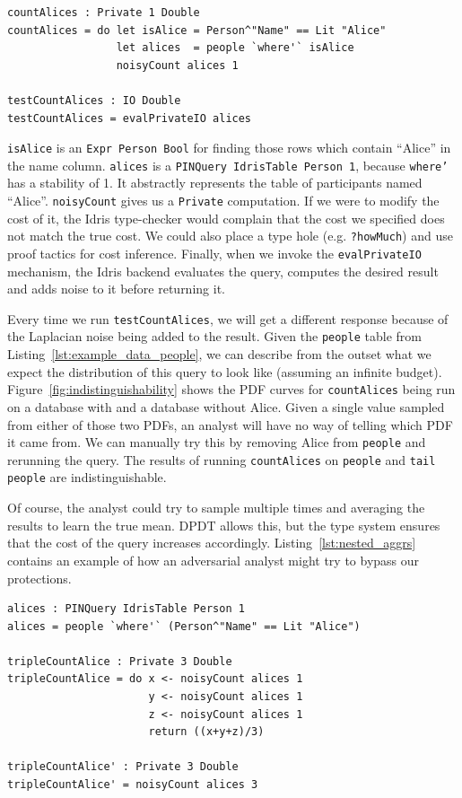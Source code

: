 \documentclass[12pt]{report}
\begin{document}
\begin{lstlisting}[float,caption={Counting Alices},label={lst:counting_alices}]
countAlices : Private 1 Double
countAlices = do let isAlice = Person^"Name" == Lit "Alice"
                 let alices  = people `where'` isAlice
                 noisyCount alices 1

testCountAlices : IO Double
testCountAlices = evalPrivateIO alices
\end{lstlisting}

\texttt{isAlice} is an \texttt{Expr Person Bool} for finding those rows which contain ``Alice'' in the name column.
\texttt{alices} is a \texttt{PINQuery IdrisTable Person 1}, because \texttt{where'} has a stability of 1.
It abstractly represents the table of participants named ``Alice''.
\texttt{noisyCount} gives us a \texttt{Private} computation.
If we were to modify the cost of it, the Idris type-checker would complain that the cost we specified does not match the true cost.
We could also place a type hole (e.g. \texttt{?howMuch}) and use proof tactics for cost inference.
Finally, when we invoke the \texttt{evalPrivateIO} mechanism, the Idris backend evaluates the query, computes the desired result and adds noise to it before returning it.

Every time we run \texttt{testCountAlices}, we will get a different response because of the Laplacian noise being added to the result.
Given the \texttt{people} table from Listing~\ref{lst:example_data_people}, we can describe from the outset what we expect the distribution of this query to look like (assuming an infinite budget).
Figure~\ref{fig:indistinguishability} shows the PDF curves for \texttt{countAlices} being run on a database with and a database without Alice.
Given a single value sampled from either of those two PDFs, an analyst will have no way of telling which PDF it came from.
We can manually try this by removing Alice from \texttt{people} and rerunning the query.
The results of running \texttt{countAlices} on \texttt{people} and \texttt{tail people} are indistinguishable.

Of course, the analyst could try to sample multiple times and averaging the results to learn the true mean.
DPDT allows this, but the type system ensures that the cost of the query increases accordingly.
Listing~\ref{lst:nested_aggrs} contains an example of how an adversarial analyst might try to bypass our protections.

\begin{lstlisting}[float,caption={Counting Alices (revisited)},label={lst:nested_aggrs}]
alices : PINQuery IdrisTable Person 1
alices = people `where'` (Person^"Name" == Lit "Alice")

tripleCountAlice : Private 3 Double
tripleCountAlice = do x <- noisyCount alices 1
                      y <- noisyCount alices 1
                      z <- noisyCount alices 1
                      return ((x+y+z)/3)

tripleCountAlice' : Private 3 Double
tripleCountAlice' = noisyCount alices 3
\end{lstlisting}
\end{document}
